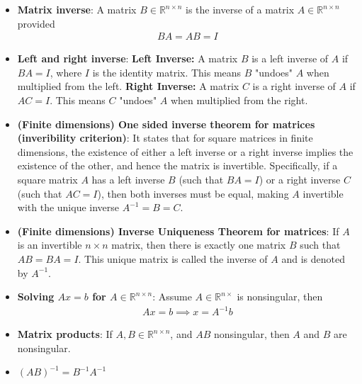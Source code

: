 \documentclass{report}
\begin{document}
    \pagebreak 
    \begin{itemize}
        \item \textbf{Matrix inverse}: A matrix $B \in \mathbb{R}^{n\times n}$ is the inverse of a matrix $A \in \mathbb{R}^{n\times n}$ provided
            \begin{align*}
                BA = AB = I
            \end{align*}
        \item \textbf{Left and right inverse}:
            \textbf{Left Inverse:} A matrix \( B \) is a left inverse of \( A \) if \( BA = I \), where \( I \) is the identity matrix. This means \( B \) "undoes" \( A \) when multiplied from the left.
            \bigbreak \noindent 
            \textbf{Right Inverse:} A matrix \( C \) is a right inverse of \( A \) if \( AC = I \). This means \( C \) "undoes" \( A \) when multiplied from the right.
        \item \textbf{(Finite dimensions) One sided inverse theorem for matrices (inveribility criterion)}: It states that for square matrices in finite dimensions, the existence of either a left inverse or a right inverse implies the existence of the other, and hence the matrix is invertible. Specifically, if a square matrix \( A \) has a left inverse \( B \) (such that \( BA = I \)) or a right inverse \( C \) (such that \( AC = I \)), then both inverses must be equal, making \( A \) invertible with the unique inverse \( A^{-1} = B = C \).
        \item \textbf{(Finite dimensions) Inverse Uniqueness Theorem for matrices}: If \( A \) is an invertible \( n \times n \) matrix, then there is exactly one matrix \( B \) such that \( AB = BA = I \). This unique matrix is called the inverse of \( A \) and is denoted by \( A^{-1} \).
        \item \textbf{Solving $Ax = b$ for $A \in \mathbb{R}^{n\times n}$}: Assume $A \in \mathbb{R}^{n\times}$ is nonsingular, then
            \begin{align*}
                Ax = b \implies x = A^{-1}b
            \end{align*}
        \item \textbf{Matrix products}: If $A,B \in \mathbb{R}^{n\times n}$, and $AB$ nonsingular, then $A$ and $B$ are nonsingular.
        \item $(AB)^{-1}  = B^{-1}A^{-1}$
    \end{itemize}
\end{document}
